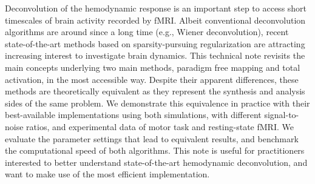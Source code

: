 Deconvolution of the hemodynamic response is an important step to access short timescales of brain activity recorded by fMRI. Albeit conventional deconvolution algorithms are around since a long time (e.g., Wiener deconvolution), recent state-of-the-art methods based on sparsity-pursuing regularization are attracting increasing interest to investigate brain dynamics. This technical note revisits the main concepts underlying two main methods, paradigm free mapping and total activation, in the most accessible way. Despite their apparent differences, these methods are theoretically equivalent as they represent the synthesis and analysis sides of the same problem. We demonstrate this equivalence in practice with their best-available implementations using both simulations, with different signal-to-noise ratios, and experimental data of motor task and resting-state fMRI. We evaluate the parameter settings that lead to equivalent results, and benchmark the computational speed of both algorithms. This note is useful for practitioners interested to better understand state-of-the-art hemodynamic deconvolution, and want to make use of the most efficient implementation.